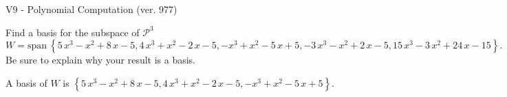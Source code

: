 \begin{exercise}
  \begin{exerciseTitle}V9 - Polynomial Computation (ver. 977)\end{exerciseTitle}
  \begin{exerciseStatement}
    Find a basis for the subspace of \(\mathcal{P}^3\) 
\[W=\mathrm{span}\ \left\{5 \, x^{3} - x^{2} + 8 \, x - 5 , 4 \, x^{3} + x^{2} - 2 \, x - 5 , -x^{3} + x^{2} - 5 \, x + 5 , -3 \, x^{3} - x^{2} + 2 \, x - 5 , 15 \, x^{3} - 3 \, x^{2} + 24 \, x - 15\right\}.\]
 Be sure to explain why your result is a basis.


  \end{exerciseStatement}
  \begin{exerciseAnswer}
   A basis of \(W\) is  \(\left\{5 \, x^{3} - x^{2} + 8 \, x - 5 , 4 \, x^{3} + x^{2} - 2 \, x - 5 , -x^{3} + x^{2} - 5 \, x + 5\right\}\).
  


  \end{exerciseAnswer}
\end{exercise}